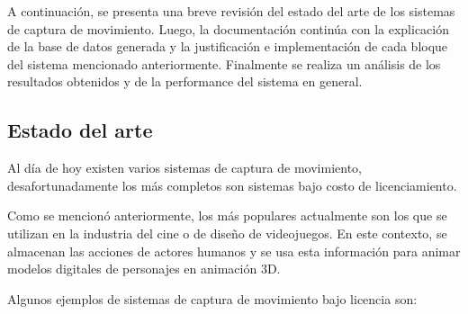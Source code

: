 A continuación, se presenta una breve revisión del estado del arte de los sistemas de captura de movimiento. Luego, la documentación continúa con la explicación de la base de datos generada y la justificación e implementación de cada bloque del sistema mencionado anteriormente. Finalmente se realiza un análisis de los resultados obtenidos y de la performance del sistema en general.

\subsection{Estado del arte}

Al día de hoy existen varios sistemas de captura de movimiento, desafortunadamente los más completos son sistemas bajo costo de licenciamiento. 

Como se mencionó anteriormente, los más populares actualmente son los que se utilizan en la industria del cine o de diseño de videojuegos. En este contexto, se almacenan las acciones de actores humanos y se usa esta información para animar modelos digitales de personajes en animación 3D.

Algunos ejemplos de sistemas de captura de movimiento bajo licencia son:

